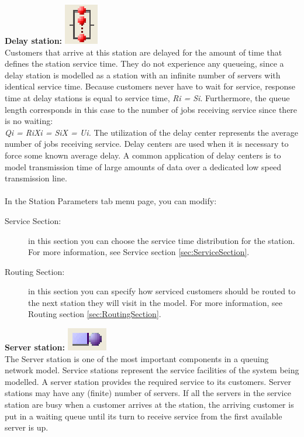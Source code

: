 \begin{enumerate*}
\item \textbf{Delay station:} \includegraphics[scale=1]{img/jsim/delay.eps}\\
Customers that arrive at this station are delayed for the amount of time that defines the station service time. They do not experience any queueing, since a delay station is modelled as a station with an infinite number of servers with identical service time. Because customers never have to wait for service, response time at delay
stations is equal to service time, \emph{Ri = Si}. Furthermore, the queue length corresponds in this case to the number of jobs receiving service since there is no waiting:\\
\emph{Qi = RiXi = SiX = Ui. }
The utilization of the delay center represents the average number of jobs receiving service.
Delay centers are used when it is necessary to force some known average delay. A common application of delay centers is to model 
transmission time of large amounts of data over a dedicated low speed transmission line.\\\\
In the Station Parameters tab menu page, you can modify:
\begin{description}
\item[Service Section:]
in this section you can choose the service time distribution for the station.
For more information, see Service section \ref{sec:ServiceSection}.
\item[Routing Section:]
in this section you can specify how serviced customers should be routed to the next station they will visit in the model. 
For more information, see Routing section \ref{sec:RoutingSection}.
\end{description}
\item \textbf{Server station:} \includegraphics[scale=1]{img/jsim/server.eps}\\
The Server station is one of the most important components in a queuing network model. Service stations represent the service facilities of the system being modelled. A server station provides the required service to its customers. Server stations may have any (finite) number of servers. If all the servers in the service station are busy when a customer arrives at the station, the arriving customer is put in a waiting queue until its turn to receive service from the first available server is up.

\end{enumerate*}
